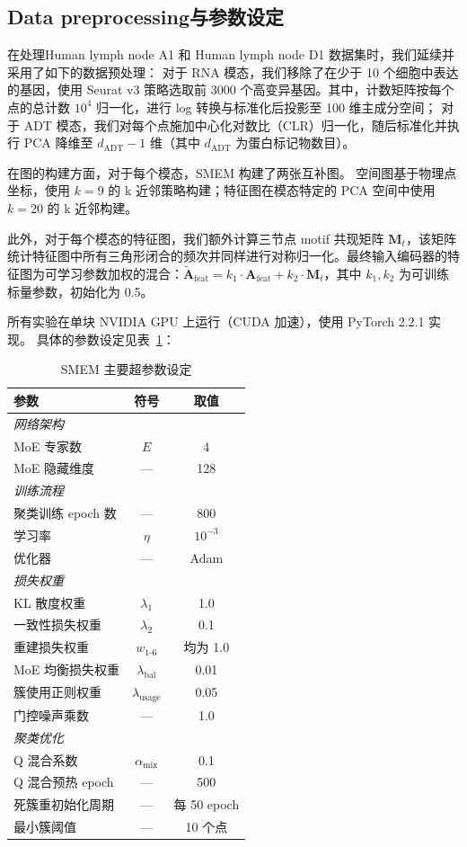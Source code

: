 \documentclass[journal]{IEEEtran}
\begin{document}
\subsection{Data preprocessing与参数设定}
在处理Human lymph node A1 和 Human lymph node D1 数据集时，我们延续并采用了如下的数据预处理：
对于 RNA 模态，我们移除了在少于 10 个细胞中表达的基因，使用 Seurat v3 策略选取前 3000 个高变异基因。其中，计数矩阵按每个点的总计数 $10^4$ 归一化，进行 log 转换与标准化后投影至 100 维主成分空间；
对于 ADT 模态，我们对每个点施加中心化对数比（CLR）归一化，随后标准化并执行 PCA 降维至 $d_{\mathrm{ADT}}-1$ 维（其中 $d_{\mathrm{ADT}}$ 为蛋白标记物数目）。

在图的构建方面，对于每个模态，SMEM 构建了两张互补图。
空间图基于物理点坐标，使用 $k=9$ 的 k 近邻策略构建；特征图在模态特定的 PCA 空间中使用 $k=20$ 的 k 近邻构建。

此外，对于每个模态的特征图，我们额外计算三节点 motif 共现矩阵 $\mathbf{M}_t$，该矩阵统计特征图中所有三角形闭合的频次并同样进行对称归一化。最终输入编码器的特征图为可学习参数加权的混合：$\tilde{\mathbf{A}}_{\mathrm{feat}} = k_1 \cdot \mathbf{A}_{\mathrm{feat}} + k_2 \cdot \mathbf{M}_t$，其中 $k_1, k_2$ 为可训练标量参数，初始化为 0.5。
 
所有实验在单块 NVIDIA GPU 上运行（CUDA 加速），使用 PyTorch 2.2.1 实现。
具体的参数设定见表~\ref{tab:parameters}：
\begin{table}[htbp]
\centering
\caption{SMEM 主要超参数设定}
\label{tab:parameters}
\begin{tabular}{lcc}
\toprule
\textbf{参数} & \textbf{符号} & \textbf{取值} \\
\midrule
\multicolumn{3}{l}{\textit{网络架构}} \\
MoE 专家数 & $E$ & 4 \\
MoE 隐藏维度 & — & 128 \\
\midrule
\multicolumn{3}{l}{\textit{训练流程}} \\
聚类训练 epoch 数 & — & 800 \\
学习率 & $\eta$ & $10^{-3}$ \\
优化器 & — & Adam \\
\midrule
\multicolumn{3}{l}{\textit{损失权重}} \\
KL 散度权重 & $\lambda_1$ & 1.0 \\
一致性损失权重 & $\lambda_2$ & 0.1 \\
重建损失权重 & $w_{1\text{-}6}$ & 均为 1.0 \\
MoE 均衡损失权重 & $\lambda_{\mathrm{bal}}$ & 0.01 \\
簇使用正则权重 & $\lambda_{\mathrm{usage}}$ & 0.05 \\
门控噪声乘数 & — & 1.0 \\
\midrule
\multicolumn{3}{l}{\textit{聚类优化}} \\
Q 混合系数 & $\alpha_{\mathrm{mix}}$ & 0.1 \\
Q 混合预热 epoch & — & 500 \\
死簇重初始化周期 & — & 每 50 epoch \\
最小簇阈值 & — & 10 个点 \\
\bottomrule
\end{tabular}
\end{table}
\end{document}

